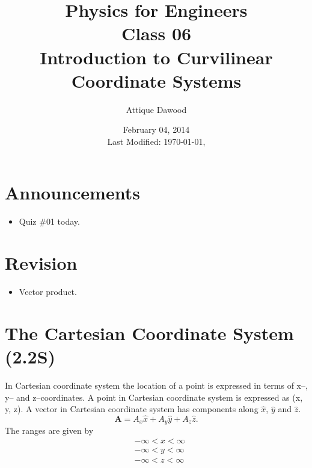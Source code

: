 \documentclass[12pt,a4paper]{article}
\title{\vspace{-2cm}Physics for Engineers\\Class 06\\Introduction to Curvilinear Coordinate Systems}
\author{Attique Dawood}
\date{February 04, 2014\\[0.2cm] Last Modified: \today, \currenttime}
\begin{document}
\maketitle
\section{Announcements}
\begin{itemize}
\item Quiz \#01 today.
\end{itemize}
\section{Revision}
\begin{itemize}
\item Vector product.
\end{itemize}
\section{The Cartesian Coordinate System (2.2S)}
In Cartesian coordinate system the location of a point is expressed in terms of x--, y-- and z--coordinates. A point in Cartesian coordinate system is expressed as (x, y, z). A vector in Cartesian coordinate system has components along $\hat x$, $\hat y$ and $\hat z$.
\begin{equation}
\textbf{A}=A_x\hat x+A_y\hat y+ A_z\hat z.
\end{equation}
The ranges are given by
\begin{equation*}
\begin{split}
&-\infty < x < \infty\\
&-\infty < y < \infty\\
&-\infty < z < \infty\\
\end{split}
\end{equation*}
\end{document}

